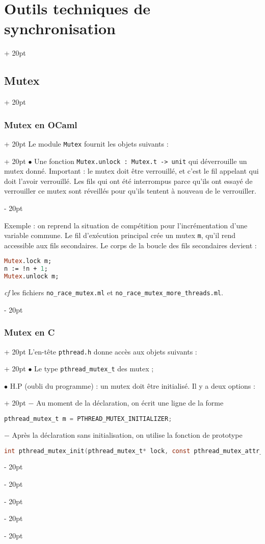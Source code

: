 \documentclass[a4paper, 12pt, twoside]{article}
\newcommand{\ind}[1][20pt]{\advance\leftskip + #1}
\newcommand{\deind}[1][20pt]{\advance\leftskip - #1}
\newenvironment{indt}[2][20pt]{#2 \par \ind[#1]}{\par \deind} %
\begin{document}
\begin{indt}{\section{Outils techniques de synchronisation}}
\begin{indt}{\subsection{Mutex}}
\begin{indt}{\subsubsection{Mutex en OCaml}}
\begin{indt}{Le module \texttt{Mutex} fournit les objets suivants :}
                    $\bullet$ Une fonction \texttt{Mutex.unlock : Mutex.t -> unit} qui déverrouille un mutex donné.
                    Important : le mutex doit être verrouillé, et c'est le fil appelant qui doit l'avoir verrouillé.
                    Les fils qui ont été interrompus parce qu'ils ont essayé de verrouiller ce mutex sont réveillés pour qu'ils tentent à nouveau de le verrouiller.
                \end{indt}

                \vspace{12pt}
                
                Exemple : on reprend la situation de compétition pour l'incrémentation d'une variable commune.
                Le fil d'exécution principal crée un mutex \texttt m, qu'il rend accessible aux fils secondaires.
                Le corps de la boucle des fils secondaires devient :

                \begin{lstlisting}[language=Caml, xleftmargin=80pt]
Mutex.lock m;
n := !n + 1;
Mutex.unlock m;\end{lstlisting}

                \textit{cf} les fichiers \texttt{no\_race\_mutex.ml} et \texttt{no\_race\_mutex\_more\_threads.ml}.
            \end{indt}

            \vspace{12pt}
            
            \begin{indt}{\subsubsection{Mutex en C}}
                \begin{indt}{L'en-tête \texttt{pthread.h} donne accès aux objets suivants :}
                    $\bullet$ Le type \texttt{pthread\_mutex\_t} des mutex ;

                    \begin{indt}{$\bullet$ H.P (oubli du programme) : un mutex doit être initialisé. Il y a deux options :}
                        $-$ Au moment de la déclaration, on écrit une ligne de la forme
                        \begin{lstlisting}[language=C, xleftmargin=120pt]
pthread_mutex_t m = PTHREAD_MUTEX_INITIALIZER;\end{lstlisting}

                        $-$ Après la déclaration sans initialisation, on utilise la fonction de prototype
                        \begin{lstlisting}[language=C, xleftmargin=120pt]
int pthread_mutex_init(pthread_mutex_t* lock, const pthread_mutex_attr_t* attr);\end{lstlisting}


\end{indt}
\end{indt}
\end{indt}
\end{indt}
\end{indt}
\end{document}
